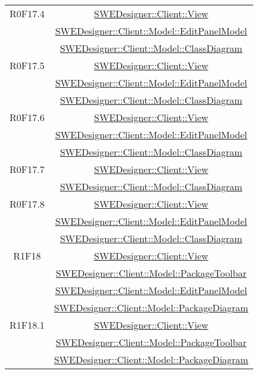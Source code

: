 \documentclass[../SpecificaTecnica.tex]{subfiles}
\begin{document}
\begin{longtable}{|c|c|}
		R0F17.4 & \hyperlink{SWEDesigner::Client::View}{SWEDesigner::Client::View} \\& \hyperlink{SWEDesigner::Client::Model::EditPanelModel}{SWEDesigner::Client::Model::EditPanelModel} \\& \hyperlink{SWEDesigner::Client::Model::ClassDiagram}{SWEDesigner::Client::Model::ClassDiagram} \\\hline
		R0F17.5 & \hyperlink{SWEDesigner::Client::View}{SWEDesigner::Client::View} \\& \hyperlink{SWEDesigner::Client::Model::EditPanelModel}{SWEDesigner::Client::Model::EditPanelModel} \\& \hyperlink{SWEDesigner::Client::Model::ClassDiagram}{SWEDesigner::Client::Model::ClassDiagram} \\\hline
		R0F17.6 & \hyperlink{SWEDesigner::Client::View}{SWEDesigner::Client::View} \\& \hyperlink{SWEDesigner::Client::Model::EditPanelModel}{SWEDesigner::Client::Model::EditPanelModel} \\& \hyperlink{SWEDesigner::Client::Model::ClassDiagram}{SWEDesigner::Client::Model::ClassDiagram} \\\hline
		R0F17.7 & \hyperlink{SWEDesigner::Client::View}{SWEDesigner::Client::View} \\& \hyperlink{SWEDesigner::Client::Model::ClassDiagram}{SWEDesigner::Client::Model::ClassDiagram} \\\hline
		R0F17.8 & \hyperlink{SWEDesigner::Client::View}{SWEDesigner::Client::View} \\& \hyperlink{SWEDesigner::Client::Model::EditPanelModel}{SWEDesigner::Client::Model::EditPanelModel} \\& \hyperlink{SWEDesigner::Client::Model::ClassDiagram}{SWEDesigner::Client::Model::ClassDiagram} \\\hline
		R1F18 & \hyperlink{SWEDesigner::Client::View}{SWEDesigner::Client::View} \\& \hyperlink{SWEDesigner::Client::Model::PackageToolbar}{SWEDesigner::Client::Model::PackageToolbar} \\& \hyperlink{SWEDesigner::Client::Model::EditPanelModel}{SWEDesigner::Client::Model::EditPanelModel} \\& \hyperlink{SWEDesigner::Client::Model::PackageDiagram}{SWEDesigner::Client::Model::PackageDiagram} \\\hline
		R1F18.1 & \hyperlink{SWEDesigner::Client::View}{SWEDesigner::Client::View} \\& \hyperlink{SWEDesigner::Client::Model::PackageToolbar}{SWEDesigner::Client::Model::PackageToolbar} \\& \hyperlink{SWEDesigner::Client::Model::PackageDiagram}{SWEDesigner::Client::Model::PackageDiagram} \\\hline

\end{longtable}
\end{document}
